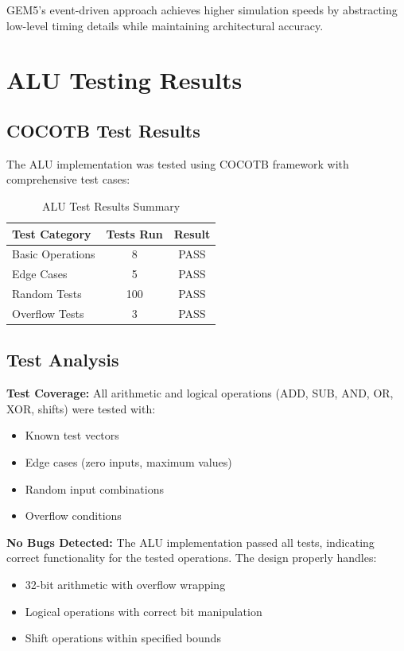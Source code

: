 \documentclass[11pt]{article}
\begin{document}
GEM5's event-driven approach achieves higher simulation speeds by abstracting low-level timing details while maintaining architectural accuracy.

\section{ALU Testing Results}

\subsection{COCOTB Test Results}

The ALU implementation was tested using COCOTB framework with comprehensive test cases:

\begin{table}[h]
\centering
\caption{ALU Test Results Summary}
\label{tab:alu_results}
\begin{tabular}{@{}lcc@{}}
\toprule
Test Category & Tests Run & Result \\
\midrule
Basic Operations & 8 & PASS \\
Edge Cases & 5 & PASS \\
Random Tests & 100 & PASS \\
Overflow Tests & 3 & PASS \\
\bottomrule
\end{tabular}
\end{table}

\subsection{Test Analysis}

\textbf{Test Coverage:} All arithmetic and logical operations (ADD, SUB, AND, OR, XOR, shifts) were tested with:
\begin{itemize}
    \item Known test vectors
    \item Edge cases (zero inputs, maximum values)
    \item Random input combinations
    \item Overflow conditions
\end{itemize}

\textbf{No Bugs Detected:} The ALU implementation passed all tests, indicating correct functionality for the tested operations. The design properly handles:
\begin{itemize}
    \item 32-bit arithmetic with overflow wrapping
    \item Logical operations with correct bit manipulation
    \item Shift operations within specified bounds
\end{itemize}
\end{document}
